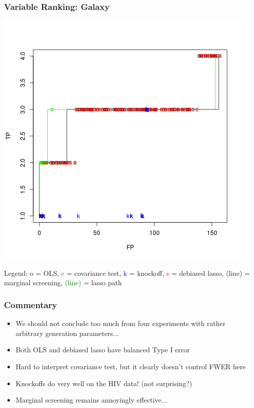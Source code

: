 \documentclass{beamer}
\begin{document}
\begin{frame}
\frametitle{Variable Ranking: Galaxy}
\begin{center}
\includegraphics[scale = 0.35]{gal_tvf.png}
\end{center}

Legend: o = OLS, \textcolor{green}{c} = covariance test,
\textcolor{blue}{k} = knockoff, \textcolor{red}{s} = debiased lasso,
(line) = marginal screening, \textcolor{green}{(line)} = lasso path
\end{frame}


\begin{frame}
\frametitle{Commentary}
\begin{itemize}
\item We should not conclude too much from four experiments with rather arbitrary generation parameters...
\item Both OLS and debiased lasso have balanced Type I error
\item Hard to interpret covariance test, but it clearly doesn't control FWER here
\item Knockoffs do very well on the HIV data!  (not surprising?)
\item Marginal screening remains annoyingly effective...
\end{itemize}
\end{frame}
\end{document}
